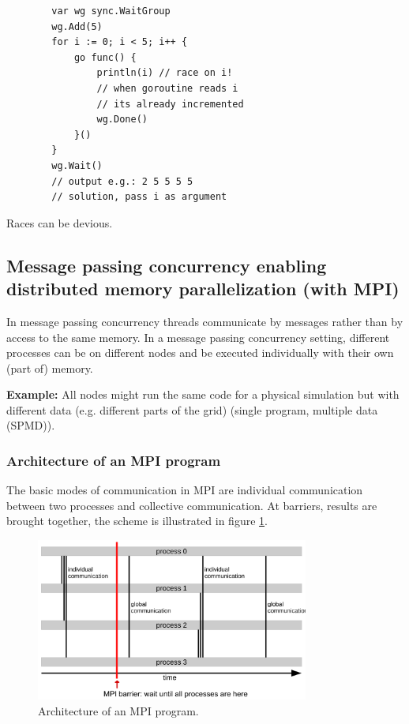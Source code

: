 \begin{codebox}[!htb]
    \begin{verbatim}
        var wg sync.WaitGroup
        wg.Add(5)
        for i := 0; i < 5; i++ {
            go func() {
                println(i) // race on i!
                // when goroutine reads i
                // its already incremented
                wg.Done()
            }()
        }
        wg.Wait()
        // output e.g.: 2 5 5 5 5
        // solution, pass i as argument
    \end{verbatim}
    \caption{Races can be devious.}
    \label{code:same_var_go}
\end{codebox}

\subsection{Message passing concurrency enabling distributed memory parallelization (with MPI)}
In message passing concurrency threads communicate by messages rather than by access to the same memory.
In a message passing concurrency setting, different processes can be on different nodes and be executed
individually with their own (part of) memory.

\textbf{Example:} All nodes might run the same code for a physical simulation
but with different data (e.g. different parts of the grid) (single program,
multiple data (SPMD)).


\subsubsection{Architecture of an MPI program}
The basic modes of communication in MPI are individual communication between two processes and collective communication.
At barriers, results are brought together, the scheme is illustrated in figure \ref{fig:mpi_architecture}.

\begin{figure}[!htb]
    \centering
    \includegraphics[width=0.8\textwidth]{figures/mpi_architecture.png}
    \caption{Architecture of an MPI program.}
    \label{fig:mpi_architecture}
\end{figure}

